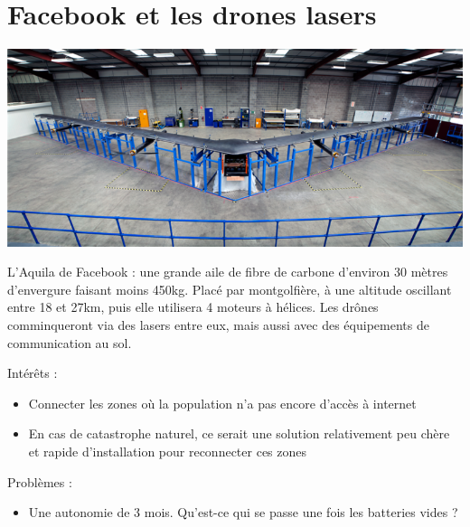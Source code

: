 \documentclass[a4paper,11pt]{report}
\begin{document}
\section{Facebook et les drones lasers}
\begin{flushleft}
\includegraphics[width=\textwidth]{../Images/facebook_aquila.png}
\end{flushleft}
L'Aquila de Facebook : une grande aile de fibre de carbone d'environ 30 mètres d'envergure faisant moins 450kg. Placé par montgolfière, à une altitude oscillant entre 18 et 27km, puis elle utilisera 4 moteurs à hélices. Les drônes comminqueront via des lasers entre eux, mais aussi avec des équipements de communication au sol.

Intérêts :
\begin{itemize}
  \item Connecter les zones où la population n'a pas encore d'accès à internet
  \item En cas de catastrophe naturel, ce serait une solution relativement peu chère et rapide d'installation pour reconnecter ces zones
\end{itemize}

Problèmes :
\begin{itemize}
  \item Une autonomie de 3 mois. Qu'est-ce qui se passe une fois les batteries vides ?
\end{itemize}
\end{document}
